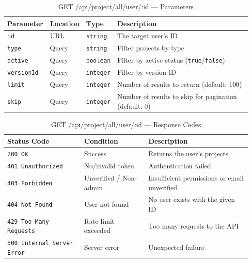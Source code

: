 \begin{table}[H]
\centering
\renewcommand{\arraystretch}{1.3}
\begin{tabularx}{\textwidth}{|l|l|l|X|}
\hline
\textbf{Parameter} & \textbf{Location} & \textbf{Type} & \textbf{Description} \\
\hline
\texttt{id}        & URL   & \texttt{string}  & The target user's ID \\
\hline
\texttt{type}      & Query & \texttt{string}  & Filter projects by type \\
\hline
\texttt{active}    & Query & \texttt{boolean} & Filter by active status (\texttt{true}/\texttt{false}) \\
\hline
\texttt{versionId} & Query & \texttt{integer} & Filter by version ID \\
\hline
\texttt{limit}     & Query & \texttt{integer} & Number of results to return (default: 100) \\
\hline
\texttt{skip}      & Query & \texttt{integer} & Number of results to skip for pagination (default: 0) \\
\hline
\end{tabularx}
\caption{GET /api/project/all/user/:id — Parameters}
\label{tab:get-projects-by-user-params}
\end{table}

\begin{table}[H]
\centering
\renewcommand{\arraystretch}{1.3}
\begin{tabularx}{\textwidth}{|l|l|X|}
\hline
\textbf{Status Code} & \textbf{Condition} & \textbf{Description} \\
\hline
\texttt{200 OK}           & Success          & Returns the user's projects \\
\hline
\texttt{401 Unauthorized} & No/invalid token & Authentication failed \\
\hline
\texttt{403 Forbidden}    & Unverified / Non-admin   & Insufficient permissions or email unverified \\
\hline
\texttt{404 Not Found}    & User not found   & No user exists with the given ID \\
\hline
\texttt{429 Too Many Requests} & Rate limit exceeded & Too many requests to the API \\
\hline
\texttt{500 Internal Server Error} & Server error & Unexpected failure \\
\hline
\end{tabularx}
\caption{GET /api/project/all/user/:id — Response Codes}
\label{tab:get-projects-by-user-responses}
\end{table}
\FloatBarrier

